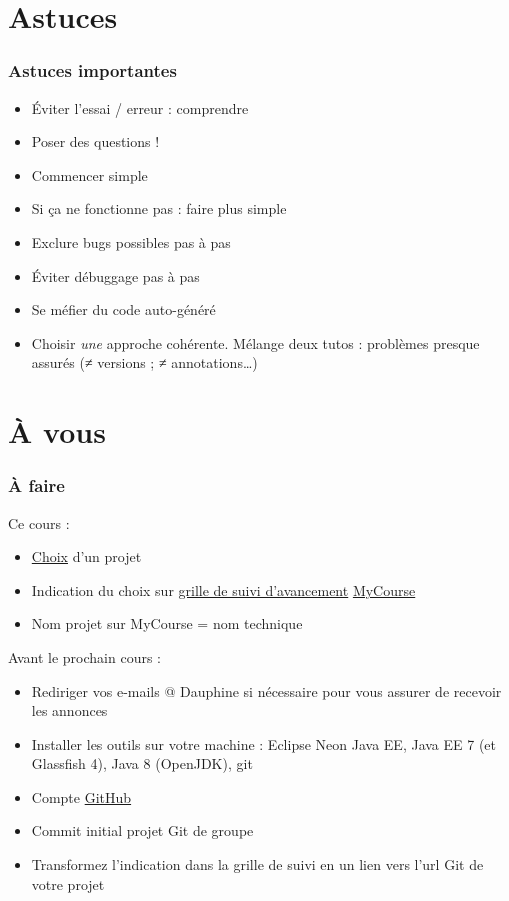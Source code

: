 \documentclass[english, french]{beamer}
\begin{document}
\section{Astuces}
\begin{frame}
	\frametitle{Astuces importantes}
	\begin{itemize}
		\item Éviter l’essai / erreur : comprendre
		\item Poser des questions !
		\item Commencer simple
		\item Si ça ne fonctionne pas : faire plus simple
		\item Exclure bugs possibles pas à pas
		\item Éviter débuggage pas à pas
		\item Se méfier du code auto-généré
		\item Choisir \emph{une} approche cohérente. Mélange deux tutos : problèmes presque assurés ({}≠ versions ; ≠ annotations…)
	\end{itemize}
\end{frame}

\section{À vous}
\begin{frame}
	\frametitle{À faire}
	Ce cours :
	\begin{itemize}
		\item \href{https://github.com/oliviercailloux/projets}{Choix} d’un projet
		\item Indication du choix sur \href{https://mycourse.dauphine.fr/webapps/Bb-wiki-BBLEARN/wikiView?course_id=_36854_1&wiki_id=_26157_1}{grille de suivi d’avancement} \href{https://mycourse.dauphine.fr/webapps/blackboard/execute/courseMain?course_id=_36854_1}{MyCourse}
			\item Nom projet sur MyCourse = nom technique
	\end{itemize}
	Avant le prochain cours :
	\begin{itemize}
		\item Rediriger vos e-mails @ Dauphine si nécessaire pour vous assurer de recevoir les annonces
		\item Installer les outils sur votre machine : Eclipse Neon Java EE, Java EE 7 (et Glassfish 4), Java 8 (OpenJDK), git
		\item Compte \href{https://github.com/}{GitHub}
		\item Commit initial projet Git de groupe
		\item Transformez l’indication dans la grille de suivi en un lien vers l’url Git de votre projet
	\end{itemize}
\end{frame}
\end{document}

